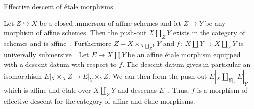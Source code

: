\documentclass[a4paper,twoside,11pt]{amsart}[2009/07/02] %
\newcommand{\inj}{\hookrightarrow}
\newcommand{\map}[3]{#1\,:\, #2\rightarrow #3}
\newcommand{\etale}{\'{e}tale}
\begin{document}
\begin{section}{Effective descent of \etale{} morphisms}

\begin{example}
Let $Z\inj X$ be a closed immersion of affine schemes and let $Z\to Y$ be any
morphism of affine schemes. Then the push-out $X\amalg_Z Y$ exists in the
category of schemes and is affine~\cite[Thm.~5.1]{ferrand_conducteur}.
Furthermore $Z=X\times_{X\amalg_Z Y} Y$ and $\map{f}{X\amalg Y}{X\amalg_Z Y}$
is universally submersive~\cite[Thm.~7.1~A)]{ferrand_conducteur}.
%
Let $E\to X\amalg Y$ be an affine \etale{} morphism equipped with a
descent datum with respect to $f$. The descent datum gives in particular
an isomorphism $E|_X \times_X Z \to E|_Y \times_Y Z$. We can then form the
push-out $E|_X \amalg_{E|_Z} E|_Y$ which is affine and \etale{}
over $X\amalg_Z Y$ and descends $E$~\cite[Thm.~2.2 (iv)]{ferrand_conducteur}.
%
Thus, $f$ is a morphism of effective descent for the category of affine and
\etale{} morphisms.


\end{example}
\end{section}
\end{document}
